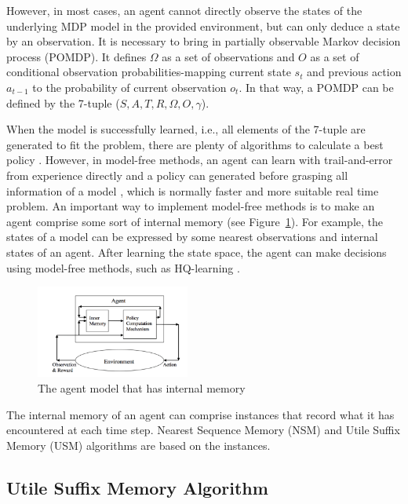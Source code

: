 \documentclass{article}
\begin{document}
However, in most cases, an agent cannot directly observe the states of the
underlying MDP model in the provided environment, but can only deduce a state by an
observation. It is necessary to bring in partially observable Markov decision
process (POMDP). It defines $\Omega$ as a set of observations and $O$ as a set of
conditional observation probabilities-mapping current state $s_t$ and
previous action $a_{t-1}$ to the probability of current observation $o_t$. 
In that way, a POMDP can be defined by the 7-tuple ($S, A, T, R, \Omega, O, \gamma$).

When the model is successfully learned, i.e., all elements of the 7-tuple are
generated to fit the problem, there are plenty of algorithms to calculate a best
policy \cite{shani2013survey}. However, in model-free methods, an agent can learn
with trail-and-error from experience directly and a policy can generated before
grasping all information of a model \cite{li2017deep}, which is normally faster
and more suitable real time problem.  An important way to implement model-free
methods is to make an agent comprise some sort of internal memory \cite{aberdeen2003policy,
meuleau1999learning, mccallum1995instance} (see Figure~\ref{fig:agent memory}).
For example, the states of a model can be expressed by some nearest observations
and internal states of an agent. After learning the state space, the agent can make
decisions using model-free methods, such as HQ-learning \cite{wiering1997hq}.

\begin{figure}[h]
  \centering
    \includegraphics[width=0.45\textwidth]{agent_with_memory.png}
  \caption{The agent model that has internal memory}
  \label{fig:agent memory}
\end{figure}

The internal memory of an agent can comprise instances that record what it has
encountered at each time step. Nearest Sequence Memory (NSM) and Utile
Suffix Memory (USM) algorithms are based on the instances.


\subsection{Utile Suffix Memory Algorithm}
\end{document}

